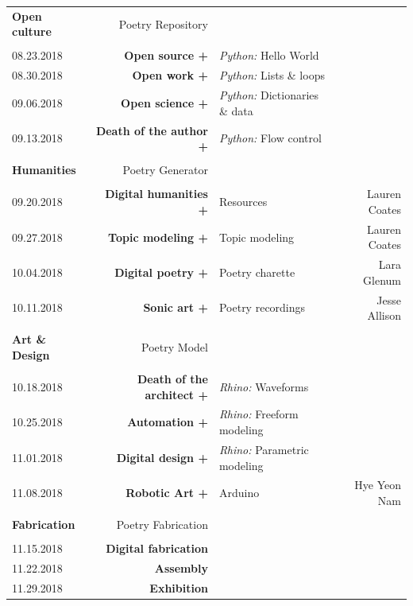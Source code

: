 \documentclass[11pt,article,oneside]{memoir}
\begin{document}
\begin{table}[H]
\begin{tabular}{l r @{\hskip 0.1cm} l r}
\\
\normalsize
\textbf{Open culture} & Poetry Repository\\
\small
\\
08.23.2018 & \textbf{Open source +} & \emph{Python:} Hello World \\
08.30.2018 & \textbf{Open work +} & \emph{Python:} Lists \& loops \\
09.06.2018 & \textbf{Open science +} & \emph{Python:} Dictionaries \& data \\
09.13.2018 & \textbf{Death of the author +} & \emph{Python:} Flow control \\
\\
\normalsize
\textbf{Humanities} & Poetry Generator\\
\small
\\
09.20.2018 & \textbf{Digital humanities +} & Resources  & Lauren Coates \\
09.27.2018 & \textbf{Topic modeling +} & Topic modeling & Lauren Coates \\
10.04.2018 & \textbf{Digital poetry +} & Poetry charette & Lara Glenum \\ %
10.11.2018 & \textbf{Sonic art +} & Poetry recordings & Jesse Allison \\ 
\\
\normalsize
\textbf{Art \& Design} & Poetry Model \\
\small
\\
10.18.2018 & \textbf{Death of the architect +} & \emph{Rhino:}  Waveforms \\
10.25.2018 & \textbf{Automation +} & \emph{Rhino:} Freeform modeling \\
11.01.2018 & \textbf{Digital design +} & \emph{Rhino:} Parametric modeling \\
11.08.2018 & \textbf{Robotic Art +} & Arduino & Hye Yeon Nam \\
\\
\normalsize
\textbf{Fabrication} & Poetry Fabrication\\
\small
\\
11.15.2018 & \textbf{Digital fabrication} \\
11.22.2018 & \textbf{Assembly} \\
11.29.2018 & \textbf{Exhibition} \\ 
%
\end{tabular}
\end{table}
\end{document}

